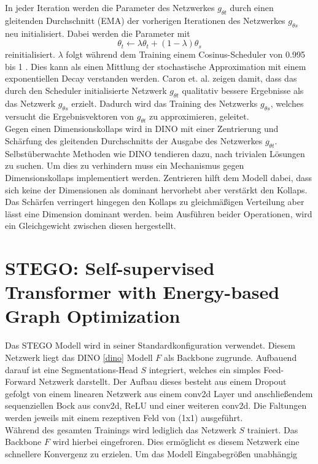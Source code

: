 		In jeder Iteration werden die Parameter des Netzwerkes  $g_{\theta t}$ durch einen gleitenden Durchschnitt (EMA) \cite{emaHe2019} der vorherigen Iterationen des Netzwerkes  $g_{\theta s}$ neu initialisiert.
		Dabei werden die Parameter mit  
		\[
		\theta_{t} \leftarrow \lambda\theta_{t} +(1-\lambda)\theta_{s}
		\]
		reinitialisiert. $\lambda$ folgt während dem Training einem Cosinus-Scheduler von 0.995 bis 1 \cite{bootstrapSelfSupGrill2020}. Dies kann als einen Mittlung der stochastische Approximation  mit einem exponentiellen Decay verstanden werden. Caron et. al. zeigen damit, dass das durch den Scheduler initialisierte Netzwerk $g_{\theta t}$ qualitativ bessere Ergebnisse als das Netzwerk  $g_{\theta s}$ erzielt. Dadurch wird das Training des Netzwerks $g_{\theta s}$, welches versucht die Ergebnisvektoren von $g_{\theta t}$ zu approximieren, geleitet.  \\
		Gegen einen Dimensionskollaps wird in DINO mit einer Zentrierung und Schärfung des gleitenden Durchschnitts der Ausgabe des Netzwerkes $g_{\theta t}$. Selbstüberwachte Methoden wie DINO tendieren dazu, nach trivialen Lösungen zu suchen. Um dies zu verhindern muss ein Mechanismus gegen Dimensionskollaps implementiert werden. Zentrieren hilft dem Modell dabei, dass sich keine der Dimensionen als dominant hervorhebt aber verstärkt den Kollaps. Das Schärfen verringert hingegen den Kollaps zu gleichmäßigen Verteilung aber lässt eine Dimension dominant werden. beim Ausführen beider Operationen, wird ein Gleichgewicht zwischen diesen hergestellt.    
		
		
	\section{STEGO: Self-supervised Transformer with Energy-based Graph Optimization}
		\label{ansatz:stego}
		
		Das STEGO \cite{STEGOhamilton2022unsupervised} Modell wird in seiner Standardkonfiguration verwendet. Diesem Netzwerk liegt das DINO \ref{dino} Modell $ F $ als Backbone zugrunde. Aufbauend darauf ist eine Segmentations-Head $ S $ integriert, welches ein simples Feed-Forward Netzwerk darstellt. Der Aufbau dieses besteht aus einem Dropout gefolgt von einem linearen Netzwerk aus einem conv2d Layer und anschließendem sequenziellen Bock aus conv2d, ReLU und einer weiteren conv2d. Die Faltungen werden jeweils mit einem rezeptiven Feld von (1x1) ausgeführt. \\
		Während des gesamten Trainings wird lediglich das Netzwerk $ S $ trainiert. Das Backbone $ F $ wird hierbei eingefroren. Dies ermöglicht es diesem Netzwerk eine schnellere Konvergenz zu erzielen. 
		Um das Modell Eingabegrößen unabhängig 

